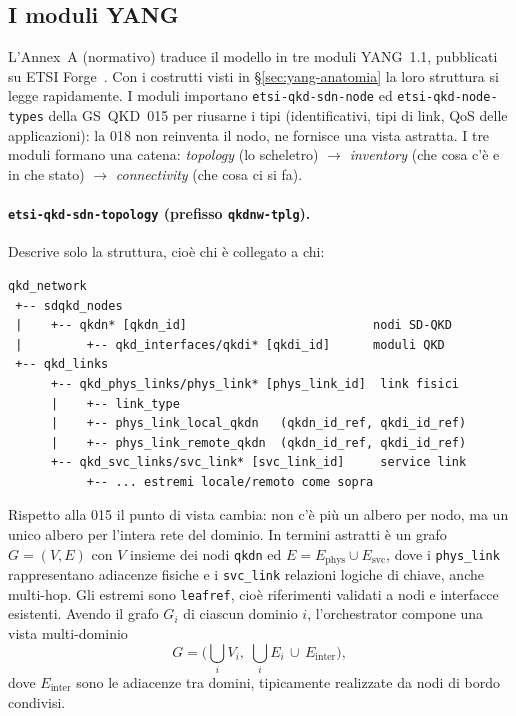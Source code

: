 \subsection{I moduli YANG}
\label{sec:yang018}

L'Annex~A (normativo) traduce il modello in tre moduli YANG~1.1, pubblicati
su ETSI Forge~\cite{qkd018yang}. Con i costrutti visti in
§\ref{sec:yang-anatomia} la loro struttura si legge rapidamente. I moduli
importano \texttt{etsi-qkd-sdn-node} ed \texttt{etsi-qkd-node-types} della
GS~QKD~015 per riusarne i tipi (identificativi, tipi di link, QoS delle
applicazioni): la 018 non reinventa il nodo, ne fornisce una vista
astratta. I tre moduli formano una catena: \emph{topology} (lo scheletro)
$\to$ \emph{inventory} (che cosa c'è e in che stato) $\to$
\emph{connectivity} (che cosa ci si fa).

\paragraph{\texttt{etsi-qkd-sdn-topology} (prefisso \texttt{qkdnw-tplg}).}
Descrive solo la struttura, cioè chi è collegato a chi:
\begin{lstlisting}
qkd_network
 +-- sdqkd_nodes
 |    +-- qkdn* [qkdn_id]                          nodi SD-QKD
 |         +-- qkd_interfaces/qkdi* [qkdi_id]      moduli QKD
 +-- qkd_links
      +-- qkd_phys_links/phys_link* [phys_link_id]  link fisici
      |    +-- link_type
      |    +-- phys_link_local_qkdn   (qkdn_id_ref, qkdi_id_ref)
      |    +-- phys_link_remote_qkdn  (qkdn_id_ref, qkdi_id_ref)
      +-- qkd_svc_links/svc_link* [svc_link_id]     service link
           +-- ... estremi locale/remoto come sopra
\end{lstlisting}
Rispetto alla 015 il punto di vista cambia: non c'è più un albero per
nodo, ma un unico albero per l'intera rete del dominio. In termini astratti
è un grafo $G=(V,E)$ con $V$ insieme dei nodi \texttt{qkdn} ed
$E = E_{\text{phys}}\cup E_{\text{svc}}$, dove i \texttt{phys\_link}
rappresentano adiacenze fisiche e i \texttt{svc\_link} relazioni logiche di
chiave, anche multi-hop. Gli estremi sono \texttt{leafref}, cioè
riferimenti validati a nodi e interfacce esistenti. Avendo il grafo $G_i$ di
ciascun dominio $i$, l'orchestrator compone una vista multi-dominio
\begin{equation}
  G = \Big(\bigcup_i V_i,\; \bigcup_i E_i \,\cup\, E_{\text{inter}}\Big),
\end{equation}
dove $E_{\text{inter}}$ sono le adiacenze tra domini, tipicamente
realizzate da nodi di bordo condivisi.

